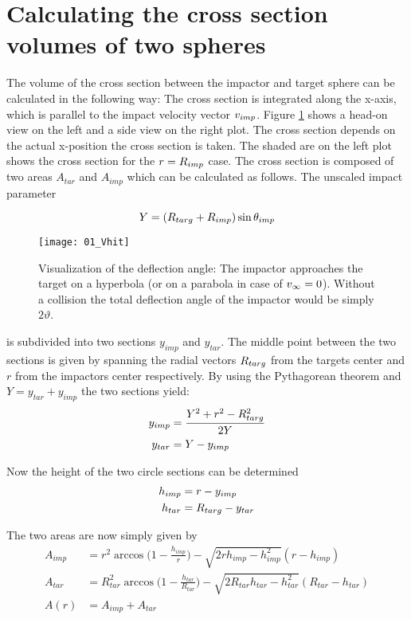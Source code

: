 \newpage
\section{Calculating the cross section volumes of two spheres}
\graphicspath{{./07figs/}}
The volume of the cross section between the impactor and target sphere can be calculated in the following way: The cross section is integrated along the x-axis, which is parallel to the impact velocity vector $v_{imp}$. Figure \ref{ch07_fig01} shows a head-on view on the left and a side view on the right plot. The cross section depends on the actual x-position the cross section is taken. The shaded are on the left plot shows the cross section for the $r = R_{imp}$ case. The cross section is composed of two areas $A_{tar}$ and $A_{imp}$ which can be calculated as follows. The unscaled impact parameter 

\begin{equation}
\label{ch07_sec01_eq001}
Y = ( R_{targ} + R_{imp} ) \sin{ \theta_{imp}} 
\end{equation}

\begin{figure}[htbp]
\begin{center}
\texttt{[image: 01\_Vhit]}
\caption{Visualization of the deflection angle: The impactor approaches the target on a hyperbola (or on a parabola in case of $v_{\infty} = 0$). Without a collision the total deflection angle of the impactor would be simply $2 \vartheta$.}
\label{ch07_fig01}
\end{center}
\end{figure}

is subdivided into two sections $y_{imp}$ and $y_{tar}$. The middle point between the two sections is given by spanning the radial vectors $R_{targ}$ from the targets center and $r$ from the impactors center respectively.    By using the Pythagorean theorem and $Y = y_{tar} + y_{imp}$ the two sections yield:
\begin{align}
\label{ch07_sec01_eq002}
y_{imp} &= \frac{Y^2 + r^2 - R_{targ}^2}{2 Y} \\
y_{tar} &= Y - y_{imp}
\end{align}

Now the height of the two circle sections can be determined
\begin{align}
\label{ch07_sec01_eq003}
h_{imp} &= r - y_{imp}\\
h_{tar} &= R_{targ} - y_{tar} 
\end{align}

The two areas are now simply given by
\begin{align}
\label{ch07_sec01_eq004}
A_{imp} &= r^2 \arccos{\Big( 1 - \frac{h_{imp}}{r} \Big) } - \sqrt{2 r h_{imp} - h_{imp}^2} (r - h_{imp} )  \\
A_{tar} &= R_{tar}^2 \arccos{\Big(1 - \frac{h_{tar}}{R_{tar}} \Big)  } - \sqrt{2 R_{tar} h_{tar} - h_{tar}^2} (R_{tar} - h_{tar} )  \\
A(r) &= A_{imp} + A_{tar}
\end{align}

